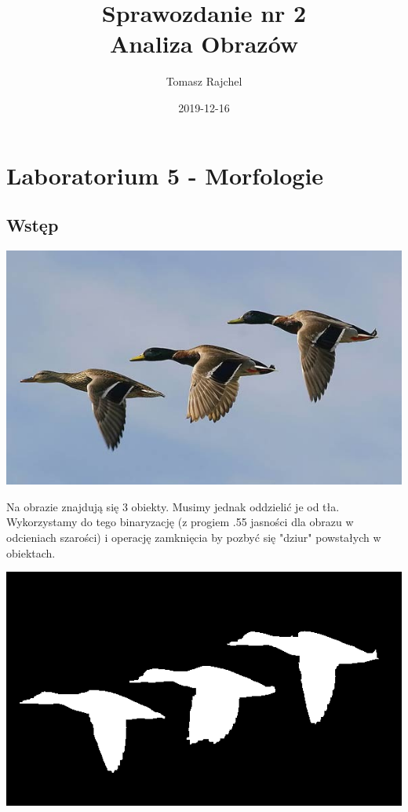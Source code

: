 \documentclass{article}
\title{Sprawozdanie nr 2\\Analiza Obrazów}
\date{2019-12-16}
\author{Tomasz Rajchel}
\begin{document}
	\maketitle

	\tableofcontents
	\newpage
	
	\section{Laboratorium 5 - Morfologie}
	\subsection{Wstęp}
	\begin{center}
		\includegraphics[width=\linewidth]{../../pictures/kaczki.jpg}
	\end{center}

	Na obrazie znajdują się 3 obiekty. Musimy jednak oddzielić je od tła. Wykorzystamy do tego binaryzację (z progiem .55 jasności dla obrazu w odcieniach szarości) i operację zamknięcia by pozbyć się "dziur" powstałych w obiektach.
	\begin{center}
		\includegraphics[width=\linewidth]{../../lab05/kaczki_binary_closed.png}
	\end{center}
\end{document}

